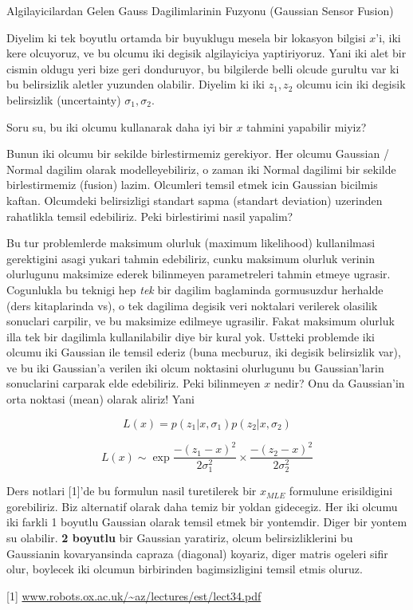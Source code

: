 \documentclass[12pt,fleqn]{article}\usepackage{../common}
\begin{document}
Algilayicilardan Gelen Gauss Dagilimlarinin Fuzyonu (Gaussian Sensor Fusion)

Diyelim ki tek boyutlu ortamda bir buyuklugu mesela bir lokasyon bilgisi
$x$'i, iki kere olcuyoruz, ve bu olcumu iki degisik algilayiciya
yaptiriyoruz. Yani iki alet bir cismin oldugu yeri bize geri donduruyor, bu
bilgilerde belli olcude gurultu var ki bu belirsizlik aletler yuzunden
olabilir. Diyelim ki iki $z_1,z_2$ olcumu icin iki degisik belirsizlik
(uncertainty) $\sigma_1,\sigma_2$. 

Soru su, bu iki olcumu kullanarak daha iyi bir $x$ tahmini yapabilir miyiz?

Bunun iki olcumu bir sekilde birlestirmemiz gerekiyor. Her olcumu Gaussian
/ Normal dagilim olarak modelleyebiliriz, o zaman iki Normal dagilimi bir
sekilde birlestirmemiz (fusion) lazim. Olcumleri temsil etmek icin Gaussian
bicilmis kaftan. Olcumdeki belirsizligi standart sapma (standart deviation)
uzerinden rahatlikla temsil edebiliriz. Peki birlestirimi nasil yapalim? 

Bu tur problemlerde maksimum olurluk (maximum likelihood) kullanilmasi
gerektigini asagi yukari tahmin edebiliriz, cunku maksimum olurluk verinin
olurlugunu maksimize ederek bilinmeyen parametreleri tahmin etmeye
ugrasir. Cogunlukla bu teknigi hep {\em tek} bir dagilim baglaminda
gormusuzdur herhalde (ders kitaplarinda vs), o tek dagilima degisik veri
noktalari verilerek olasilik sonuclari carpilir, ve bu maksimize edilmeye
ugrasilir. Fakat maksimum olurluk illa tek bir dagilimla kullanilabilir
diye bir kural yok. Ustteki problemde iki olcumu iki Gaussian ile temsil
ederiz (buna mecburuz, iki degisik belirsizlik var), ve bu iki Gaussian'a
verilen iki olcum noktasini olurlugunu bu Gaussian'larin sonuclarini
carparak elde edebiliriz. Peki bilinmeyen $x$ nedir? Onu da Gaussian'in
orta noktasi (mean) olarak aliriz! Yani

$$ L(x) = p(z_1|x,\sigma_1) p(z_2|x,\sigma_2) $$

$$ L(x) \sim \exp{\frac{-(z_1-x)^2}{2\sigma_1^2} } 
\times \frac{-(z_2-x)^2}{2\sigma_2^2} $$

Ders notlari [1]'de bu formulun nasil turetilerek bir $x_{MLE}$ formulune
erisildigini gorebiliriz. Biz alternatif olarak daha temiz bir yoldan
gidecegiz. Her iki olcumu iki farkli 1 boyutlu Gaussian olarak temsil etmek
bir yontemdir. Diger bir yontem su olabilir. \textbf{2 boyutlu} bir
Gaussian yaratiriz, olcum belirsizliklerini bu Gaussianin kovaryansinda
capraza (diagonal) koyariz, diger matris ogeleri sifir olur, boylecek iki
olcumun birbirinden bagimsizligini temsil etmis oluruz.



[1] \url{www.robots.ox.ac.uk/~az/lectures/est/lect34.pdf}
\end{document}
